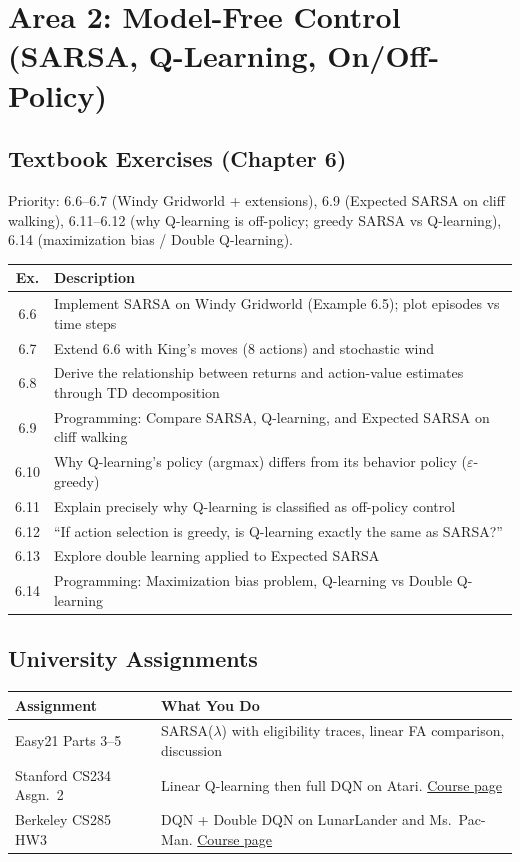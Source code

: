 \documentclass[11pt,letterpaper]{article}
\begin{document}
\newpage
\section{Area 2: Model-Free Control (SARSA, Q-Learning, On/Off-Policy)}

\subsection{Textbook Exercises (Chapter 6)}

Priority: 6.6--6.7 (Windy Gridworld + extensions), 6.9 (Expected SARSA on cliff walking), 6.11--6.12 (why Q-learning is off-policy; greedy SARSA vs Q-learning), 6.14 (maximization bias / Double Q-learning).

\begin{longtable}{@{}cp{4.8in}@{}}
\toprule
\textbf{Ex.} & \textbf{Description} \\
\midrule
\endhead
6.6 & Implement SARSA on Windy Gridworld (Example 6.5); plot episodes vs time steps \\
6.7 & Extend 6.6 with King's moves (8 actions) and stochastic wind \\
6.8 & Derive the relationship between returns and action-value estimates through TD decomposition \\
6.9 & Programming: Compare SARSA, Q-learning, and Expected SARSA on cliff walking \\
6.10 & Why Q-learning's policy (argmax) differs from its behavior policy ($\varepsilon$-greedy) \\
6.11 & Explain precisely why Q-learning is classified as off-policy control \\
6.12 & ``If action selection is greedy, is Q-learning exactly the same as SARSA?'' \\
6.13 & Explore double learning applied to Expected SARSA \\
6.14 & Programming: Maximization bias problem, Q-learning vs Double Q-learning \\
\bottomrule
\end{longtable}

\subsection{University Assignments}

\begin{longtable}{@{}p{2in}p{3.8in}@{}}
\toprule
\textbf{Assignment} & \textbf{What You Do} \\
\midrule
\endhead
Easy21 Parts 3--5 & SARSA($\lambda$) with eligibility traces, linear FA comparison, discussion \\
\addlinespace
Stanford CS234 Asgn.\ 2 & Linear Q-learning then full DQN on Atari. \href{https://web.stanford.edu/class/cs234/}{Course page} \\
\addlinespace
Berkeley CS285 HW3 & DQN + Double DQN on LunarLander and Ms.\ Pac-Man. \href{https://rail.eecs.berkeley.edu/deeprlcourse/}{Course page} \\
\bottomrule
\end{longtable}
\end{document}
